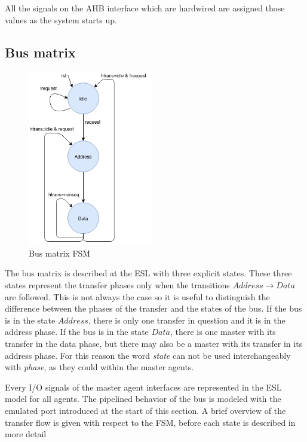 All the signals on the AHB interface which are hardwired are assigned those values as the system starts up. 

\newpage
\subsection{Bus matrix}
\label{sub:bus-matrix}
\begin{figure}
\includegraphics[width=5.5cm]{figs/ESL/Bus_fsm_new.png}
\caption{Bus matrix FSM}\label{fig:busfsm}
\end{figure}
The bus matrix is described at the ESL with three explicit states. These three states represent the transfer phases only when the transitions $Address\rightarrow Data$ are followed. This is not always the case so it is useful to distinguish the difference between the phases of the transfer and the states of the bus. If the bus is in the state $Address$, there is only one transfer in question and it is in the address phase. If the bus is in the state $Data$, there is one master with its transfer in the data phase, but there may also be a master with its transfer in its address phase. For this reason the word \textit{state} can not be used interchangeably with \textit{phase}, as they could within the master agents.\par
Every I/O signals of the master agent interfaces are represented in the ESL model for all agents. The pipelined behavior of the bus is modeled with the emulated port introduced at the start of this section. A brief overview of the transfer flow is given with respect to the FSM, before each state is described in more detail \par

